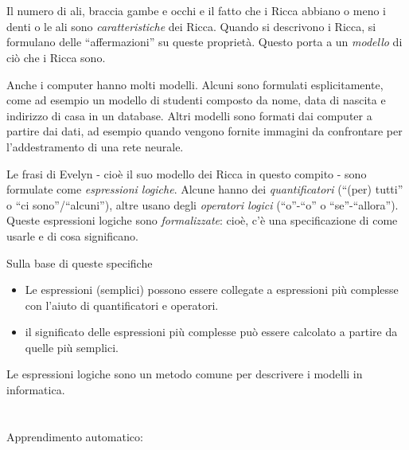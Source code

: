 {{%
\section*{\BrochureItsInformatics}
Il numero di ali, braccia gambe e occhi e il fatto che i Ricca abbiano o meno i denti o le ali sono \emph{caratteristiche} dei Ricca. Quando si descrivono i Ricca, si formulano delle \enquote{affermazioni} su queste proprietà. Questo porta a un \emph{modello} di ciò che i Ricca sono.

Anche i computer hanno molti modelli. Alcuni sono formulati esplicitamente, come ad esempio un modello di studenti composto da nome, data di nascita e indirizzo di casa in un database. Altri modelli sono formati dai computer a partire dai dati, ad esempio quando vengono fornite immagini da confrontare per l’addestramento di una rete neurale.

Le frasi di Evelyn - cioè il suo modello dei Ricca in questo compito - sono formulate come \emph{espressioni logiche}. Alcune hanno dei \emph{quantificatori} (\enquote{(per) tutti} o \enquote{ci sono}/\enquote{alcuni}), altre usano degli \emph{operatori logici} (\enquote{o}-\enquote{o} o \enquote{se}-\enquote{allora}). Queste espressioni logiche sono \emph{formalizzate}: cioè, c’è una specificazione di come usarle e di cosa significano.

Sulla base di queste specifiche

\begin{itemize}
  \item Le espressioni (semplici) possono essere collegate a espressioni più complesse con l’aiuto di quantificatori e operatori.
  \item il significato delle espressioni più complesse può essere calcolato a partire da quelle più semplici.
\end{itemize}

Le espressioni logiche sono un metodo comune per descrivere i modelli in informatica.



\section*{\BrochureWebsitesAndKeywords}
{\raggedright
Apprendimento automatico: \href{https://it.wikipedia.org/wiki/Apprendimento_automatico}{}


}}}
